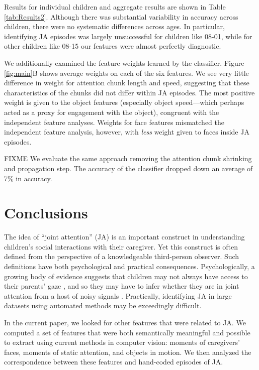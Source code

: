 \documentclass[10pt,letterpaper]{article}
\begin{document}
Results for individual children and aggregate results are shown in Table \ref{tab:Results2}. Although there was substantial variability in accuracy across children, there were no systematic differences across ages. In particular, identifying JA episodes was largely unsuccessful for children like 08-01, while for other children like 08-15 our features were almost perfectly diagnostic. 

We additionally examined the feature weights learned by the classifier. Figure \ref{fig:main}B shows average weights on each of the six features. We see very little difference in weight for attention chunk length and speed, suggesting that these characteristics of the chunks did not differ within JA episodes. The most positive weight is given to the object features (especially object speed---which perhaps acted as a proxy for engagement with the object), congruent with the independent feature analyses. Weights for face features mismatched the independent feature analysis, however, with \emph{less} weight given to faces inside JA episodes. 

FIXME We evaluate the same approach removing the attention chunk shrinking and propagation step. The accuracy of the classifier dropped down an average of 7\% in accuracy. 

\section{Conclusions}

The idea of ``joint attention'' (JA) is an important construct in understanding children's social interactions with their caregiver. Yet this construct is often defined from the perspective of a knowledgeable third-person observer. Such definitions have both psychological and practical consequences. Psychologically, a growing body of evidence suggests that children may not always have access to their parents' gaze \cite{franchak2011,yu2013,frank2013}, and so they may have to infer whether they are in joint attention from a host of noisy signals \cite{frank2013b}. Practically, identifying JA in large datasets using automated methods may be exceedingly difficult. 

In the current paper, we looked for other features that were related to JA. We computed a set of features that were both semantically meaningful and possible to extract using current methods in computer vision: moments of caregivers' faces, moments of static attention, and objects in motion. We then analyzed the correspondence between these features and hand-coded episodes of JA. 
\end{document}
